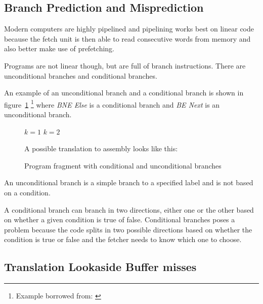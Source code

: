 \subsection{Branch Prediction and Misprediction}
Modern computers are highly pipelined and pipelining works best on linear code because the fetch unit is then able to read consecutive words from memory and also better make use of prefetching.

Programs are not linear though, but are full of branch instructions. There are unconditional branches and conditional branches. 

An example of an unconditional branch and a conditional branch is shown in figure~\ref{fig:branchexample} \footnote{Example borrowed from: \citep[Section~4.5.2]{Tanenbaum}} where \textit{BNE Else} is a conditional branch and \textit{BE Next} is an unconditional branch.
 

\begin{figure}\begin{framed}
\begin{algorithmic}
	\State $k = 1$
\Else
	\State $k = 2$
\EndIf
\end{algorithmic}
\vspace{0.3cm}
\noindent
A possible translation to assembly looks like this:
\vspace{0.3cm}
\begin{compactenum}
\item \itab{ }  
\item \itab{ }  
\item {}  
\item \itab{ }  
\item {}  
\item {}
\end{compactenum}
\caption{Program fragment with conditional and unconditional branches}
\label{fig:branchexample}
\end{framed}
\end{figure}

An unconditional branch is a simple branch to a specified label and is not based on a condition.

A conditional branch can branch in two directions, either one or the other based on whether a given condition is true of false.
Conditional branches poses a problem because the code splits in two possible directions based on whether the condition is true or false and the fetcher needs to know which one to choose.






\subsection{Translation Lookaside Buffer misses}
